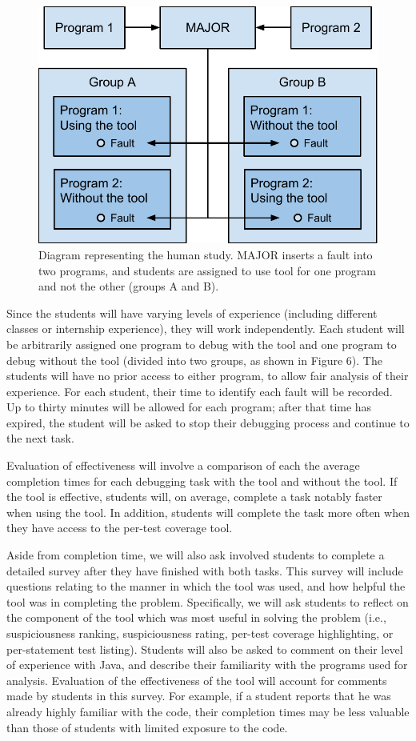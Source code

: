 \documentclass[11pt]{article}
\begin{document}
\begin{figure}[htbp]
  \centering
  \includegraphics[width=0.65\linewidth]{img/study.pdf}
  \caption{Diagram representing the human study.  MAJOR inserts a fault
  into two programs, and students are assigned to use tool for one
  program and not the other (groups A and B).}
  \label{studyd}
\end{figure}

Since the students will have varying levels of experience (including
different classes or internship experience), they will work
independently.  Each student will be arbitrarily assigned one program to
debug with the tool and one program to debug without the tool (divided
into two groups, as shown in Figure 6).  The
students will have no prior access to either program, to allow fair
analysis of their experience.  For each student, their time to identify
each fault will be recorded.  Up to thirty minutes will be allowed for
each program; after that time has expired, the student will be asked to
stop their debugging process and continue to the next task.  

Evaluation of effectiveness will involve a comparison of each the
average completion times for each debugging task with the tool and
without the tool.  If the tool is effective, students will, on average,
complete a task notably faster when using the tool.  In addition,
students will complete the task more often when they have access to the
per-test coverage tool.

Aside from completion time, we will also ask involved students to
complete a detailed survey after they have finished with both tasks.
This survey will include questions relating to the manner in which the
tool was used, and how helpful the tool was in completing the problem.
Specifically, we will ask students to reflect on the component of the
tool which was most useful in solving the problem (i.e., suspiciousness
ranking, suspiciousness rating, per-test coverage highlighting, or
per-statement test listing).  Students will also be asked to comment on
their level of experience with Java, and describe their familiarity with
the programs used for analysis.  Evaluation of the effectiveness of the
tool will account for comments made by students in this survey.  For
example, if a student reports that he was already highly familiar with
the code, their completion times may be less valuable than those of
students with limited exposure to the code.
\end{document}
